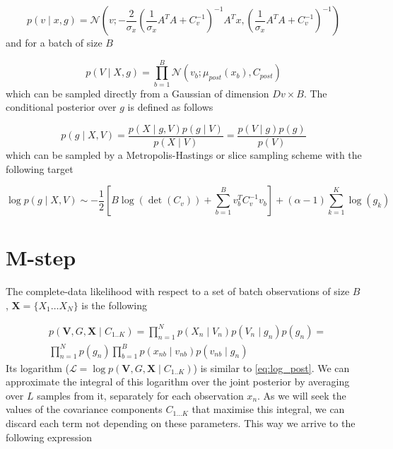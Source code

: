 \documentclass{paper}
\begin{document}
\begin{equation}
p(v \mid x,g) = \mathcal{N}\left(v; -\frac{2}{\sigma_x} \left(\frac{1}{\sigma_x} A^T A + C_v^{-1}\right)^{-1} A^T x, \left(\frac{1}{\sigma_x} A^T A + C_v^{-1}\right)^{-1}\right)
\end{equation}
%
and for a batch of size $B$

\begin{equation}
p(V \mid X,g) = \prod_{b=1}^B \mathcal{N} \left(v_b; \mu_{post}(x_b),C_{post} \right)
\end{equation}
%
which can be sampled directly from a Gaussian of dimension $Dv \times B$. The conditional posterior over $g$ is defined as follows

\begin{equation} 
p(g \mid X,V) = \frac{p(X \mid g,V) p(g \mid V)}{p(X \mid V)} = \frac{p(V \mid g) p(g)}{p(V)}
\end{equation}
%
which can be sampled by a Metropolis-Hastings or slice sampling scheme with the following target

\begin{equation} 
\log p(g \mid X,V) \sim -\frac{1}{2} \left[B\log(\det(C_v)) + \sum_{b=1}^B v_b^T C_v^{-1} v_b\right] + (\alpha-1) \sum_{k=1}^K \log(g_k)
\end{equation}

\section{M-step}

The complete-data likelihood with respect to a set of batch observations of size $B$, $\mathbf{X} = \lbrace X_1 \dots X_N \rbrace$ is the following

\begin{equation}
\begin{split}
&p(\mathbf{V},G,\mathbf{X} \mid C_{1..K}) = \prod_{n=1}^N p(X_n \mid V_n) p(V_n \mid g_n) p(g_n) = \\
&\prod_{n=1}^N p(g_n) \prod_{b=1}^B p(x_{nb} \mid v_{nb}) p(v_{nb} \mid g_n) 
\end{split}
\end{equation}
%
Its logarithm ($\mathcal{L}=\log p(\mathbf{V},G,\mathbf{X} \mid C_{1..K})$) is similar to \ref{eq:log_post}. We can approximate the integral of this logarithm over the joint posterior by averaging over $L$ samples from it, separately for each observation $x_n$. As we will seek the values of the covariance components $C_{1 \dots K}$ that maximise this integral, we can discard each term not depending on these parameters. This way we arrive to the following expression 
\end{document}
